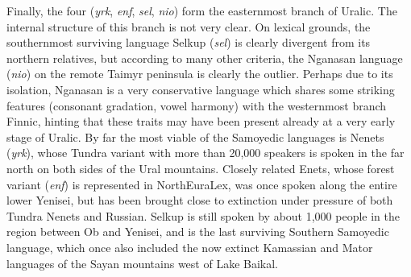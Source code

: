 Finally, the four  (\textit{yrk}, \textit{enf}, \textit{sel}, \textit{nio}) form the easternmost branch of Uralic. The internal structure of this branch is not very clear. On lexical grounds, the southernmost surviving language Selkup (\textit{sel}) is clearly divergent from its northern relatives, but according to many other criteria, the Nganasan language (\textit{nio}) on the remote Taimyr peninsula is clearly the outlier. Perhaps due to its isolation, Nganasan is a very conservative language which shares some striking features (consonant gradation, vowel harmony) with the westernmost branch Finnic, hinting that these traits may have been present already at a very early stage of Uralic. By far the most viable of the Samoyedic languages is Nenets (\textit{yrk}), whose Tundra variant with more than 20,000 speakers is spoken in the far north on both sides of the Ural mountains. Closely related Enets, whose forest variant (\textit{enf}) is represented in NorthEuraLex, was once spoken along
the entire lower Yenisei, but has been brought close to extinction under pressure of both Tundra Nenets and Russian. Selkup is still spoken by about 1,000 people in the region between Ob and Yenisei, and is the last surviving Southern Samoyedic language, which once also included the now extinct Kamassian and Mator languages of the Sayan mountains west of Lake Baikal.

